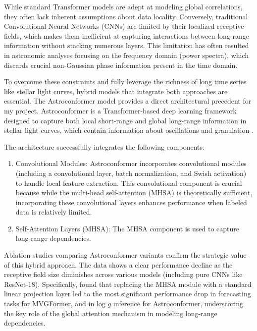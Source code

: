 \documentclass[letterpaper]{article} %
\begin{document}
While standard Transformer models are adept at modeling global correlations, they often lack inherent assumptions about data locality. Conversely, traditional Convolutional Neural Networks (CNNs) are limited by their localized receptive fields, which makes them inefficient at capturing interactions between long-range information without stacking numerous layers. This limitation has often resulted in astronomic analyses focusing on the frequency domain (power spectra), which discards crucial non-Gaussian phase information present in the time domain.

To overcome these constraints and fully leverage the richness of long time series like stellar light curves, hybrid models that integrate both approaches are essential. The Astroconformer model provides a direct architectural precedent for my project. Astroconformer is a Transformer-based deep learning framework designed to capture both local short-range and global long-range information in stellar light curves, which contain information about oscillations and granulation \cite{pan2024astroconformer}.

The architecture successfully integrates the following components:

\begin{enumerate}
    \item {Convolutional Modules:} Astroconformer incorporates convolutional modules (including a convolutional layer, batch normalization, and Swish activation) to handle local feature extraction. This convolutional component is crucial because while the multi-head self-attention (MHSA) is theoretically sufficient, incorporating these convolutional layers enhances performance when labeled data is relatively limited.
    
    \item {Self-Attention Layers (MHSA):} The MHSA component is used to capture long-range dependencies.
\end{enumerate}

Ablation studies comparing Astroconformer variants confirm the strategic value of this hybrid approach. The data shows a clear performance decline as the receptive field size diminishes across various models (including pure CNNs like ResNet-18). Specifically, \citeauthor{pan2024astroconformer} found that replacing the MHSA module with a standard linear projection layer led to the most significant performance drop in forecasting tasks for MVGFormer, and in log $g$ inference for Astroconformer, underscoring the key role of the global attention mechanism in modeling long-range dependencies.
\end{document}
